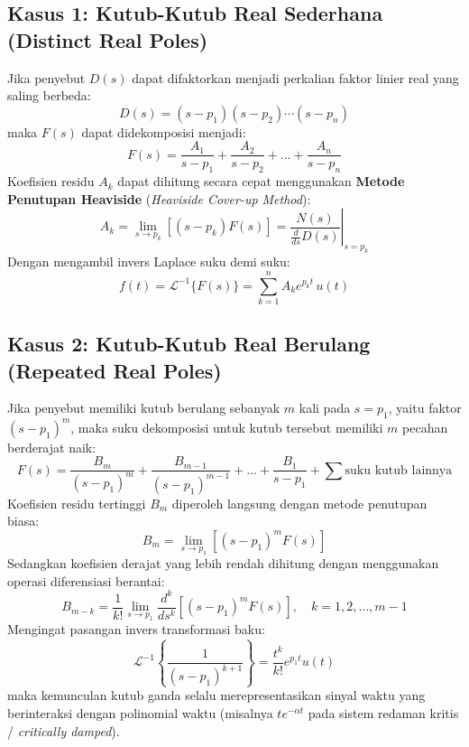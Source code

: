 \documentclass[11pt,a4paper]{article}
\theoremstyle{definition}
\begin{document}
\subsection{Kasus 1: Kutub-Kutub Real Sederhana (Distinct Real Poles)}
Jika penyebut $D(s)$ dapat difaktorkan menjadi perkalian faktor linier real yang saling berbeda:
\begin{equation}
    D(s) = (s - p_1)(s - p_2)\cdots(s - p_n)
\end{equation}
maka $F(s)$ dapat didekomposisi menjadi:
\begin{equation}
    F(s) = \frac{A_1}{s - p_1} + \frac{A_2}{s - p_2} + \dots + \frac{A_n}{s - p_n}
    \label{eq:pfe_distinct}
\end{equation}
Koefisien residu $A_k$ dapat dihitung secara cepat menggunakan \textbf{Metode Penutupan Heaviside} (\textit{Heaviside Cover-up Method}):
\begin{equation}
    A_k = \lim_{s \to p_k} \left[ (s - p_k) F(s) \right] = \left. \frac{N(s)}{\frac{d}{ds}D(s)} \right|_{s = p_k}
    \label{eq:heaviside_coverup}
\end{equation}
Dengan mengambil invers Laplace suku demi suku:
\begin{equation}
    f(t) = \mathcal{L}^{-1}\{F(s)\} = \sum_{k=1}^{n} A_k e^{p_k t} \, u(t)
    \label{eq:inv_distinct}
\end{equation}

\subsection{Kasus 2: Kutub-Kutub Real Berulang (Repeated Real Poles)}
Jika penyebut memiliki kutub berulang sebanyak $m$ kali pada $s = p_1$, yaitu faktor $(s - p_1)^m$, maka suku dekomposisi untuk kutub tersebut memiliki $m$ pecahan berderajat naik:
\begin{equation}
    F(s) = \frac{B_m}{(s - p_1)^m} + \frac{B_{m-1}}{(s - p_1)^{m-1}} + \dots + \frac{B_1}{s - p_1} + \sum \text{suku kutub lainnya}
    \label{eq:pfe_repeated}
\end{equation}
Koefisien residu tertinggi $B_m$ diperoleh langsung dengan metode penutupan biasa:
\begin{equation}
    B_m = \lim_{s \to p_1} \left[ (s - p_1)^m F(s) \right]
\end{equation}
Sedangkan koefisien derajat yang lebih rendah dihitung dengan menggunakan operasi diferensiasi berantai:
\begin{equation}
    B_{m-k} = \frac{1}{k!} \lim_{s \to p_1} \frac{d^k}{ds^k} \left[ (s - p_1)^m F(s) \right], \quad k = 1, 2, \dots, m-1
    \label{eq:repeated_diff_formula}
\end{equation}
Mengingat pasangan invers transformasi baku:
\begin{equation}
    \mathcal{L}^{-1}\left\{ \frac{1}{(s - p_1)^{k+1}} \right\} = \frac{t^k}{k!} e^{p_1 t} u(t)
\end{equation}
maka kemunculan kutub ganda selalu merepresentasikan sinyal waktu yang berinteraksi dengan polinomial waktu (misalnya $t e^{-\alpha t}$ pada sistem redaman kritis / \textit{critically damped}).
\end{document}
